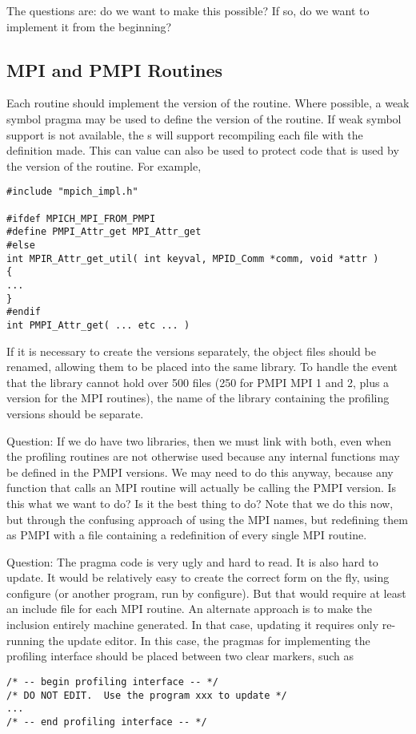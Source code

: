 \documentclass{article}
\begin{document}
The questions are: do we want to make this possible?  If so, do we
want to implement it from the beginning?

\subsection{MPI and PMPI Routines}
Each routine should implement the  version of the routine.
Where possible, a weak symbol pragma may be used to define the
 version of the routine.  If weak symbol support is not
available, the s will support recompiling each file
with the definition  made.  This can value
can also be used to protect code that is used by the 
version of the routine.  For example, 
\begin{verbatim}
#include "mpich_impl.h"

#ifdef MPICH_MPI_FROM_PMPI
#define PMPI_Attr_get MPI_Attr_get
#else
int MPIR_Attr_get_util( int keyval, MPID_Comm *comm, void *attr )
{
...
}
#endif
int PMPI_Attr_get( ... etc ... )
\end{verbatim}

If it is necessary to create the  versions separately, the
object files should be renamed, allowing them to be placed into the
same library.  To handle the event that the library cannot hold over
500 files (250 for PMPI MPI 1 and 2, plus a version for the MPI
routines), the name of the library containing the profiling versions
should be separate.

Question: If we do have two libraries, then we must link with both,
even when the profiling routines are not otherwise used because any
internal functions may be defined in the PMPI versions.  We may need
to do this anyway, because any function that calls an MPI routine will
actually be calling the PMPI version.  Is this what we want to do?  Is
it the best thing to do?  Note that we do this now, but through the
confusing approach of using the MPI names, but redefining them as PMPI
with a file containing a redefinition of every single MPI routine.

Question: The pragma code is very ugly and hard to read.  It is also hard to
update.
It would be relatively
easy to create the correct form on the fly, using configure (or
another program, run by configure).  But that
would require at least an include file for each MPI routine.
An alternate approach is to make the inclusion entirely machine
generated.  In that case, updating it requires only re-running the
update editor.  In this case, the pragmas for implementing the
profiling interface should be placed between two clear markers, such
as 
\begin{verbatim}
/* -- begin profiling interface -- */
/* DO NOT EDIT.  Use the program xxx to update */
...
/* -- end profiling interface -- */
\end{verbatim}
\end{document}

